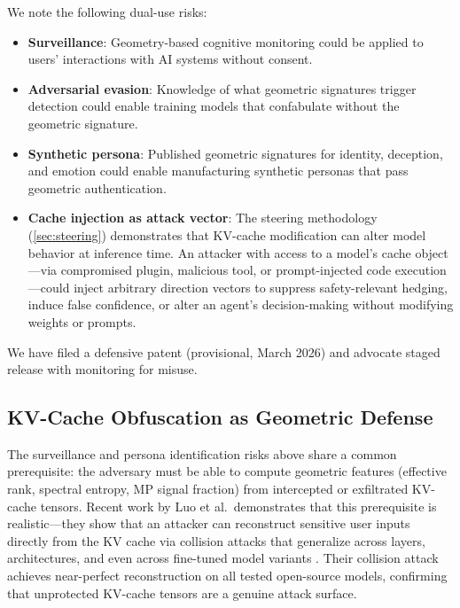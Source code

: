 We note the following dual-use risks:

\begin{itemize}[nosep]
  \item \textbf{Surveillance}: Geometry-based cognitive monitoring could
    be applied to users' interactions with AI systems without consent.
  \item \textbf{Adversarial evasion}: Knowledge of what geometric
    signatures trigger detection could enable training models that
    confabulate without the geometric signature.
  \item \textbf{Synthetic persona}: Published geometric signatures for
    identity, deception, and emotion could enable manufacturing
    synthetic personas that pass geometric authentication.
  \item \textbf{Cache injection as attack vector}: The steering
    methodology (\cref{sec:steering}) demonstrates that KV-cache
    modification can alter model behavior at inference time. An attacker
    with access to a model's cache object---via compromised plugin,
    malicious tool, or prompt-injected code execution---could inject
    arbitrary direction vectors to suppress safety-relevant hedging,
    induce false confidence, or alter an agent's decision-making without
    modifying weights or prompts.
\end{itemize}

We have filed a defensive patent (provisional, March 2026) and advocate
staged release with monitoring for misuse.

\subsection{KV-Cache Obfuscation as Geometric Defense}\label{sec:kv_cloak}

The surveillance and persona identification risks above share a common
prerequisite: the adversary must be able to compute geometric features
(effective rank, spectral entropy, MP signal fraction) from intercepted or
exfiltrated KV-cache tensors. Recent work by Luo et al.\ demonstrates that
this prerequisite is realistic---they show that an attacker can reconstruct
sensitive user inputs directly from the KV cache via collision attacks that
generalize across layers, architectures, and even across fine-tuned model
variants \citep{luo2026shadow}. Their collision attack achieves near-perfect
reconstruction on all tested open-source models, confirming that unprotected
KV-cache tensors are a genuine attack surface.

